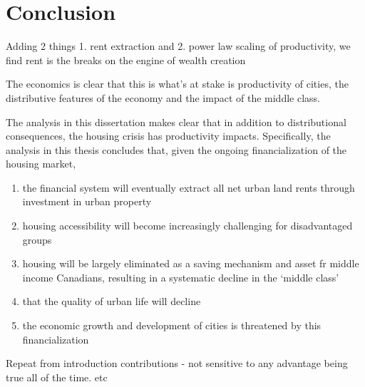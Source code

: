 
\chapter{Conclusion}

Adding 2 things 1. rent extraction and 2. power law scaling of productivity, we find rent is the breaks on the engine of wealth creation

The economics is clear that this is what's at stake is productivity of cities, the distributive features of the economy and the impact of the middle class.

The analysis in this dissertation makes clear that in addition to distributional consequences, the housing crisis has productivity impacts. Specifically, the analysis in this thesis concludes that, given the ongoing financialization of the housing market,

\begin{enumerate}
\item the financial system will eventually extract all net urban land rents through investment in urban property
\item housing accessibility will become increasingly challenging for disadvantaged groups
\item housing will be largely eliminated as a saving mechanism and asset fr middle income Canadians,  resulting in a systematic decline in the `middle class'
\item that the quality of urban life will decline
\item the economic growth and development of cities is threatened by this financialization
\end{enumerate}




Repeat from introduction contributions
- not sensitive to any advantage being true all of the time. etc